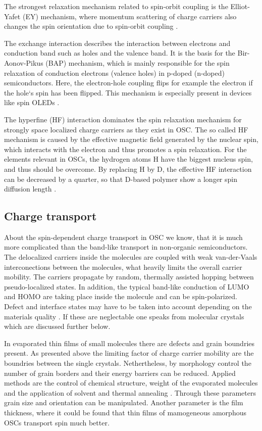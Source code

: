 The strongest relaxation mechanism related to spin-orbit coupling is the Elliot-Yafet (EY) mechanism, where momentum scattering of charge carriers also changes the spin orientation due to spin-orbit coupling \cite{elliott}.

The exchange interaction describes the interaction between electrons and conduction band such as holes and the valence band.
It is the basis for the Bir-Aonov-Pikus (BAP) mechanism, which is mainly responsible for the spin relaxation of conduction electrons (valence holes) in p-doped (n-doped) semiconductors.
Here, the electron-hole coupling flips for example the electron if the hole`s spin has been flipped.
This mechanism is especially present in devices like spin OLEDs \cite{perovskite} \cite{spin-OLED}.

The hyperfine (HF) interaction dominates the spin relaxation mechanism for strongly space localized charge carriers as they exist in OSC.
The so called HF mechanism is caused by the effective magnetic field generated by the nuclear spin, which interacts with the electron and thus promotes a spin relaxation.
For the elements relevant in OSCs, the hydrogen atoms H have the biggest nucleus spin, and thus should be overcome.
By replacing H by D, the effective HF interaction can be decreased by a quarter, so that D-based polymer show a longer spin diffusion length \cite{perovskite} \cite{hyperfine}.

\subsection{Charge transport}

About the spin-dependent charge transport in OSC we know, that it is much more complicated than the band-like transport in non-organic semiconductors.
The delocalized carriers inside the molecules are coupled with weak van-der-Vaals interconections between the molecules, what heavily limits the overall carrier mobility.
The carriers propagate by random, thermally assisted hopping between pseudo-localized states.
In addition, the typical band-like conduction of LUMO and HOMO are taking place inside the molecule and can be spin-polarized.
Defect and interface states may have to be taken into account depending on the materials quality \cite{routes} \cite{perovskite}.
If these are neglectable one speaks from molecular crystals which are discussed further below.

In evaporated thin films of small molecules there are defects and grain boundries present.
As presented above the limiting factor of charge carrier mobility are the boundries between the single crystals.
Nethertheless, by morphology control the number of grain borders and their energy barriers can be reduced.
Applied methods are the control of chemical structure, weight of the evaporated molecules and the application of solvent and thermal annealing \cite{morphology}.
Through these parameters grain size and orientation can be manipulated.
Another parameter is the film thickness, where it could be found that thin films of mamogeneous amorphous OSCs transport spin much better.

